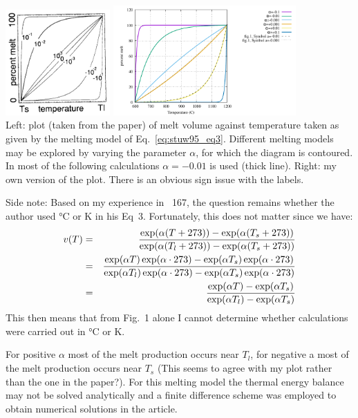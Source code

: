 \begin{center}
\includegraphics[width=4cm]{python_codes/fieldstone_169/images/stuw95a}
\includegraphics[width=7cm]{python_codes/fieldstone_169/images/percent_melt_C}\\
Left: plot (taken from the paper) of melt volume against temperature taken as given by
the melting model of Eq.~\eqref{eq:stuw95_eq3}. Different melting models may
be explored by varying the parameter $\alpha$, for which the diagram 
is contoured. In most of the following calculations
$\alpha= - 0.01$ is used (thick line).
Right: my own version of the plot. {\color{red} There is an obvious sign issue with the labels}.
\end{center}

Side note: Based on my experience in \stone~167, the question remains whether the 
author used \si{\celsius} or \si{\kelvin} in his Eq~3. Fortunately, this does not matter since
we have:
\begin{eqnarray}
v(T) 
&=& \frac{\exp(\alpha (T+273))- \exp(\alpha (T_s+273)) }{\exp(\alpha (T_l+273)) - \exp(\alpha (T_s+273)) } \nonumber\\
&=& \frac{\exp(\alpha T) \exp(\alpha\cdot 273)- \exp(\alpha T_s) \exp(\alpha\cdot 273)}
{\exp(\alpha T_l) \exp(\alpha\cdot 273)- \exp(\alpha T_s) \exp(\alpha\cdot 273)} \nonumber\\
&=& \frac{\exp(\alpha T)- \exp(\alpha T_s) }{\exp(\alpha T_l) - \exp(\alpha T_s) } \nonumber
\end{eqnarray}
This then means that from Fig.~1 alone I cannot determine whether calculations were 
carried out in \si{\celsius} or \si{\kelvin}.



For positive $\alpha$ most of the melt production occurs near $T_l$, for negative a most of the
melt production occurs near $T_s$ (This seems to agree with my plot rather than the 
one in the paper?). For this melting
model the thermal energy balance may not be
solved analytically and a finite difference scheme
was employed to obtain numerical solutions in the article.

